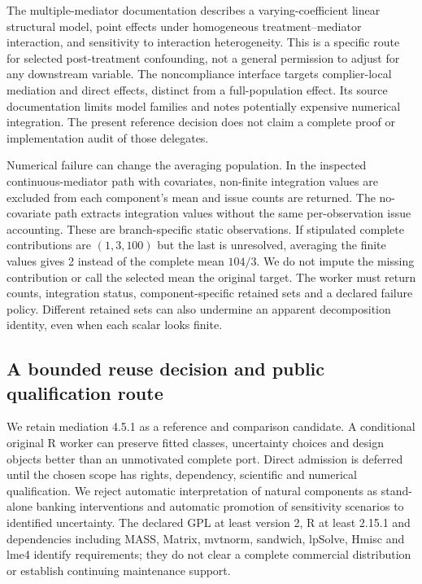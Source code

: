 The multiple-mediator documentation describes a varying-coefficient linear
structural model, point effects under homogeneous treatment--mediator
interaction, and sensitivity to interaction heterogeneity. This is a specific
route for selected post-treatment confounding, not a general permission to
adjust for any downstream variable. The noncompliance interface targets
complier-local mediation and direct effects, distinct from a full-population
effect. Its source documentation limits model families and notes potentially
expensive numerical integration. The present reference decision does not
claim a complete proof or implementation audit of those delegates.
\citep{exec24_mediation_sources}

Numerical failure can change the averaging population. In the inspected
continuous-mediator path with covariates, non-finite integration values are
excluded from each component's mean and issue counts are returned. The
no-covariate path extracts integration values without the same per-observation
issue accounting. These are branch-specific static observations. If stipulated
complete contributions are $(1,3,100)$ but the last is unresolved, averaging
the finite values gives 2 instead of the complete mean $104/3$. We do not
impute the missing contribution or call the selected mean the original target.
The worker must return counts, integration status, component-specific retained
sets and a declared failure policy. Different retained sets can also undermine
an apparent decomposition identity, even when each scalar looks finite.
\citep{exec24_mediation_sources,exec24_mediation_contract}

\subsection{A bounded reuse decision and public qualification route}
We retain mediation 4.5.1 as a reference and comparison candidate. A conditional
original R worker can preserve fitted classes, uncertainty choices and design
objects better than an unmotivated complete port. Direct admission is deferred
until the chosen scope has rights, dependency, scientific and numerical
qualification. We reject automatic interpretation of natural components as
stand-alone banking interventions and automatic promotion of sensitivity
scenarios to identified uncertainty. The declared GPL at least version 2,
R at least 2.15.1 and dependencies including MASS, Matrix, mvtnorm, sandwich,
lpSolve, Hmisc and lme4 identify requirements; they do not clear a complete
commercial distribution or establish continuing maintenance support.
\citep{exec24_mediation_sources,exec24_mediation_contract}

